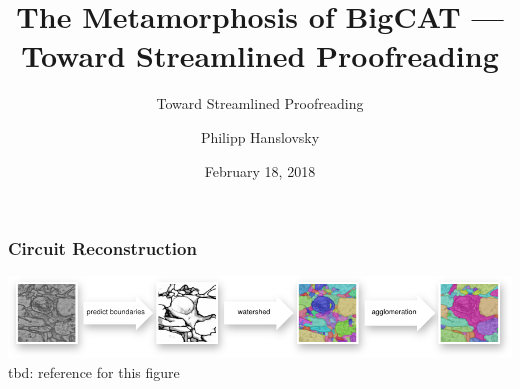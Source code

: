 \documentclass[aspectratio=169]{beamer}
\title[Janelia Theme]{The Metamorphosis of BigCAT --- Toward Streamlined Proofreading}
\subtitle{Toward Streamlined Proofreading}
\author{Philipp Hanslovsky}
\date{February 18, 2018}
\begin{document}
\setcounter{showProgressBar}{0}
\setcounter{showSlideNumbers}{0}

\frame{\titlepage}

\begin{frame}
    \frametitle{Circuit Reconstruction}
    \includegraphics{fig/reconstruction-pipeline.pdf}
    tbd: reference for this figure
\end{frame}
\end{document}
